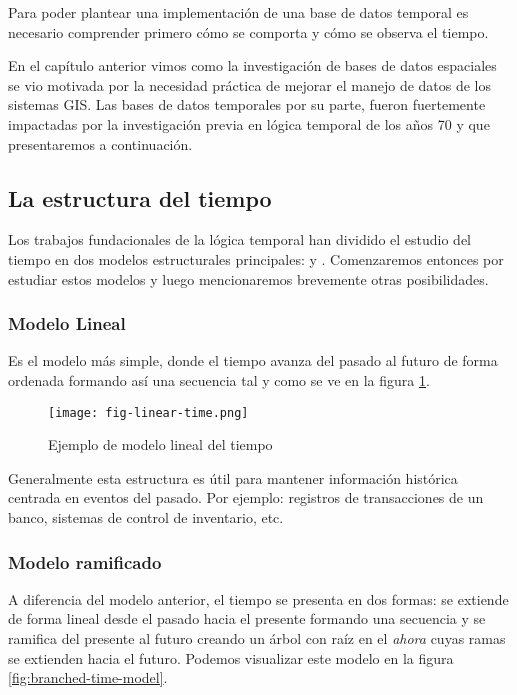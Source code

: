 Para poder plantear una implementación de una base de datos temporal es necesario comprender primero
cómo se comporta y cómo se observa el tiempo.

En el capítulo anterior vimos como la investigación de bases de datos espaciales se vio motivada por
la necesidad práctica de mejorar el manejo de datos de los sistemas GIS.
Las bases de datos temporales por su parte, fueron fuertemente impactadas por
la investigación previa en lógica temporal de los años 70\textsuperscript{\cite{temporal:status:directions}}
y que presentaremos a continuación.

\subsection{La estructura del tiempo}

Los trabajos fundacionales de la lógica temporal han dividido el estudio del tiempo en dos modelos estructurales principales:
 y \textsuperscript{\cite{temporal:snodgrass}}.
Comenzaremos entonces por estudiar estos modelos y luego mencionaremos brevemente otras posibilidades.

\subsubsection{Modelo Lineal}

Es el modelo más simple, donde el tiempo avanza del pasado al futuro de forma ordenada formando así una secuencia
tal y como se ve en la figura \ref{fig:linear-time-model}.

\begin{figure}
    \centering
    \texttt{[image: fig-linear-time.png]}
    \caption{Ejemplo de modelo lineal del tiempo}
    \label{fig:linear-time-model}
\end{figure}

Generalmente esta estructura es útil para mantener información histórica centrada en eventos del pasado.
Por ejemplo: registros de transacciones de un banco, sistemas de control de inventario, etc.

\subsubsection{Modelo ramificado}

A diferencia del modelo anterior, el tiempo se presenta en dos formas:
se extiende de forma lineal desde el pasado hacia el presente formando una secuencia
y se ramifica del presente al futuro creando un árbol con raíz en el \textit{ahora} cuyas ramas se extienden hacia el futuro.
Podemos visualizar este modelo en la figura \ref{fig:branched-time-model}.

